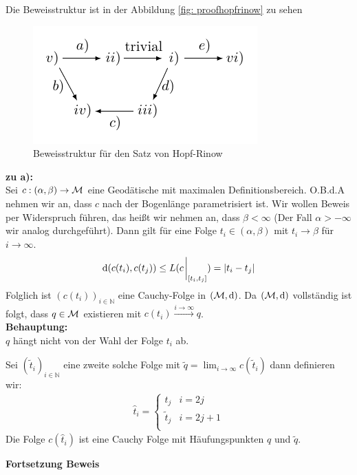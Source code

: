 \begin{bew}
    Die Beweisstruktur ist in der Abbildung \ref{fig: proofhopfrinow} zu sehen
    \begin{figure}[H]
        \centering
        \includegraphics[width=0.5\linewidth]{figures/tikz/proofhopfrinow.pdf}
        \caption{Beweisstruktur für den Satz von Hopf-Rinow}
        \label{fig:proofhopfrinow}
    \end{figure} 


\textbf{zu a):}\\
Sei $c : (\alpha , \beta) \to \mathcal{M}$ eine Geodätische mit maximalen Definitionsbereich.
O.B.d.A nehmen wir an, dass $c$ nach der Bogenlänge parametrisiert ist. 
Wir wollen Beweis per Widerspruch führen, das heißt wir nehmen an, 
dass $\beta < \infty$ (Der Fall $\alpha > - \infty$ wir analog durchgeführt).
Dann gilt für eine Folge $t_i \in (\alpha , \beta)$ mit $t_i \to \beta$ für $i \to \infty$.
\begin{align*}
    \dd (c (t_i), c(t_j)) \leq L (c \eval_{[t_i , t_j ]}) = \abs{t_i - t_j}
\end{align*}
Folglich ist $(c(t_i))_{i \in \mathbb{N}}$ eine Cauchy-Folge in $(\mathcal{M} , \dd)$. 
Da $(\mathcal{M}, \dd)$ vollständig ist folgt, 
dass $q \in \mathcal{M}$ existieren mit $c(t_i) \overset{i \to \infty}{\longrightarrow}q$.\\
\textbf{Behauptung:}\\
$q$ hängt nicht von der Wahl der Folge $t_i$ ab.

\begin{bew}[Behauptung]
Sei $(\tilde{t}_i)_{i \in \mathbb{N}}$ eine zweite solche Folge mit 
$\tilde{q} = \lim_{i\to\infty} c(\tilde{t}_i)$ dann definieren wir:
\begin{align}
    \hat{t}_i = \left\{
\begin{array}{ll}
t_j & i = 2 j \\
\tilde{t}_j & i = 2j + 1 \\
\end{array}
\right.
\end{align}
Die Folge $c(\hat{t}_i)$ ist eine Cauchy Folge mit Häufungspunkten $q$ und $\tilde{q}$.
\end{bew}
\textbf{Fortsetzung Beweis}\\


\end{bew}

